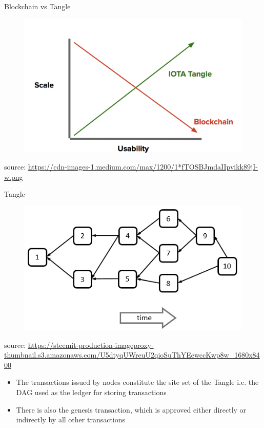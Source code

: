 \documentclass[10pt]{beamer}
\begin{document}
\begin{frame}{Blockchain vs Tangle}
	\begin{figure}[]
		\centering
		\includegraphics  [scale=0.2]{Images/tanglevsblock}
	\end{figure}
	\begin{scriptsize}
		source: \href{https://blog.iota.org/a-primer-on-iota-with-presentation-e0a6eb2cc621}{https://cdn-images-1.medium.com/max/1200/1*fTOSBJmdaIIpvikk89jI-w.png}
	\end{scriptsize}
\end{frame}


\begin{frame}{Tangle}
	\begin{figure}[]
		\centering
		\includegraphics  [scale=0.35]{Images/iota-dag}
	\end{figure}
	\begin{scriptsize}
		source: \href{https://steemkr.com/iota/@wolfofcrypto/iota-is-it-worth-one-iota}{https://steemit-production-imageproxy-thumbnail.s3.amazonaws.com/U5dtyqUWreuU2qioSuThYEewccKwp8w\_1680x8400}
	\end{scriptsize}
	\begin{itemize}
		\item The transactions issued by nodes constitute the site set of the Tangle i.e. the DAG used as the ledger for storing transactions
		\item There is also the genesis transaction, which is approved either directly or indirectly by all other transactions
	\end{itemize}
\end{frame}
\end{document}
